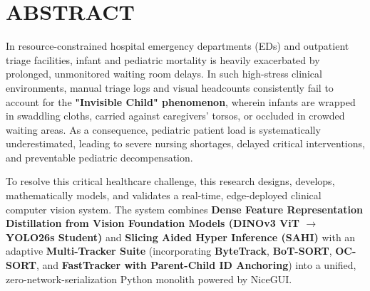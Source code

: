 \chapter*{ABSTRACT}

In resource-constrained hospital emergency departments (EDs) and outpatient triage facilities, infant and pediatric mortality is heavily exacerbated by prolonged, unmonitored waiting room delays. In such high-stress clinical environments, manual triage logs and visual headcounts consistently fail to account for the \textbf{"Invisible Child" phenomenon}, wherein infants are wrapped in swaddling cloths, carried against caregivers' torsos, or occluded in crowded waiting areas. As a consequence, pediatric patient load is systematically underestimated, leading to severe nursing shortages, delayed critical interventions, and preventable pediatric decompensation.

To resolve this critical healthcare challenge, this research designs, develops, mathematically models, and validates a real-time, edge-deployed clinical computer vision system. The system combines \textbf{Dense Feature Representation Distillation from Vision Foundation Models (DINOv3 ViT $\to$ YOLO26s Student)} and \textbf{Slicing Aided Hyper Inference (SAHI)} with an adaptive \textbf{Multi-Tracker Suite} (incorporating \textbf{ByteTrack}, \textbf{BoT-SORT}, \textbf{OC-SORT}, and \textbf{FastTracker with Parent-Child ID Anchoring}) into a unified, zero-network-serialization Python monolith powered by NiceGUI.

